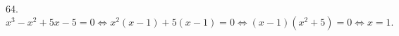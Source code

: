 64. $x^3-x^2+5x-5=0\Leftrightarrow x^2(x-1)+5(x-1)=0\Leftrightarrow (x-1)(x^2+5)=0\Leftrightarrow x=1.$\\
